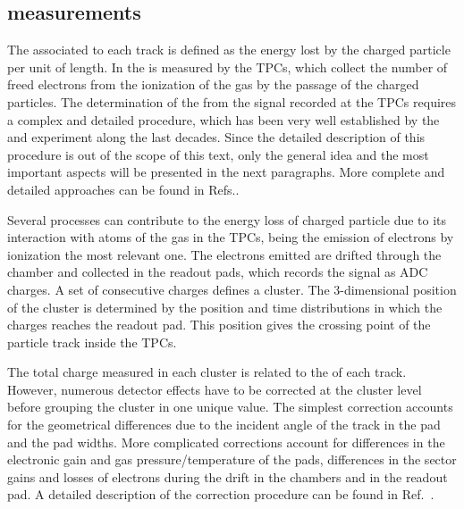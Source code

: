 \subsection{\dedx measurements}
\label{sec:hadron:dedx:meas}

\cite{Alt:2005zq}

\cite{BlumBook}


The \dedx associated to each track is defined as the energy lost by the charged
particle per unit of length.
In \NASixtyOne the \dedx is measured by the TPCs, which collect the number of
freed electrons from the ionization of the gas by the passage of the charged particles.
The determination of the \dedx from the signal recorded at the TPCs requires a complex and
detailed procedure, which has been very well established by the \NAFortyNine and \NASixtyOne
experiment along the last decades. Since the detailed description of this procedure
is out of the scope of this text, only the general idea and the most important aspects
will be presented in the next paragraphs. More complete and detailed approaches
can be found in Refs.\cite{LeeuwenThesis,GaborVeresThesis}.

Several processes can contribute to the energy loss of charged particle due to
its interaction with atoms of the gas in the TPCs, being the emission of
electrons by ionization the most relevant one. The electrons emitted are
drifted through the chamber and collected in the readout pads, which records
the signal as ADC charges. A set of consecutive charges defines a cluster.
The 3-dimensional position of the cluster is determined by the position
and time distributions in which the charges reaches the readout pad. This
position gives the crossing point of the particle track inside the TPCs.

The total charge measured in each cluster is related to the \dedx of each track.
However, numerous detector effects have to be corrected at the cluster level before
grouping the cluster in one unique \dedx value. The simplest correction accounts for
the geometrical differences due to the incident angle of the track in the pad and
the pad widths. More complicated corrections account for differences in the electronic
gain and gas pressure/temperature of the pads, differences in the sector gains and
losses of electrons during the drift in the chambers and in the readout pad.
A detailed description of the correction procedure can be found in Ref.~\cite{AntoniMThesis}.

